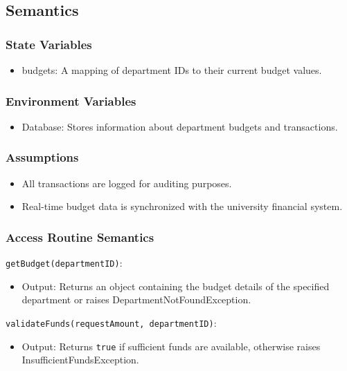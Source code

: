 \documentclass[12pt, titlepage]{article}
\begin{document}
\subsection{Semantics}
\subsubsection{State Variables}
\begin{itemize}
    \item budgets: A mapping of department IDs to their current budget values.
\end{itemize}

\subsubsection{Environment Variables}
\begin{itemize}
    \item Database: Stores information about department budgets and transactions.
\end{itemize}

\subsubsection{Assumptions}
\begin{itemize}
    \item All transactions are logged for auditing purposes.
    \item Real-time budget data is synchronized with the university financial system.
\end{itemize}

\subsubsection{Access Routine Semantics}
\noindent \texttt{getBudget(departmentID)}:
\begin{itemize}
    \item Output: Returns an object containing the budget details of the specified department or raises DepartmentNotFoundException.
\end{itemize}

\noindent \texttt{validateFunds(requestAmount, departmentID)}:
\begin{itemize}
    \item Output: Returns \texttt{true} if sufficient funds are available, otherwise raises InsufficientFundsException.
\end{itemize}
\end{document}
